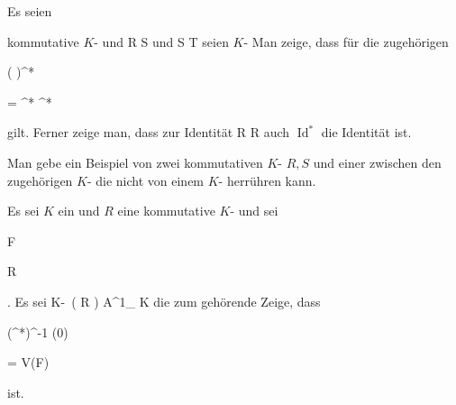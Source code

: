 {


Es seien

 kommutative
$K$-
und
\maabb {\varphi} { R } { S
} {}
und
\maabb {\psi} { S } { T
} {}
seien
$K$-
Man zeige, dass für die zugehörigen


\mavergleichskettedisp

{\vergleichskette

{ ( \psi \circ  \varphi )^*
}

{ =} { \varphi^*  \circ  \psi^*
}

{ } {
}

{ } {
}

{ } {
}

}
{}{}{}
gilt. Ferner zeige man, dass zur Identität
 { R } { R
} {}
auch $\operatorname{Id}^*$ die Identität ist.


}

{} {}



{}

{


Man gebe ein Beispiel von zwei kommutativen
$K$-
$R,S$
und einer
zwischen den zugehörigen
$K$-
die nicht von einem
$K$-
herrühren kann.


}

{} {}



{}

{


Es sei $K$ ein
und $R$ eine kommutative
$K$-
und sei


\mavergleichskette

{\vergleichskette

{ F
}

{ \in }{ R
}

{  }{
}

{    }{
}

{   }{
}

}
{}{}{.}
Es sei
\maabbdisp {\varphi^*} { K\!-\!\, \left(   R   \right) } { {\mathbb A}^{1}_{ K }
} {}
die zum
gehörende
Zeige, dass


\mavergleichskettedisp

{\vergleichskette

{ (\varphi^*)^{-1} (0)
}

{ =} { V(F)
}

{ } {
}

{ } {
}

{ } {
}

}
{}{}{}
ist.


}

